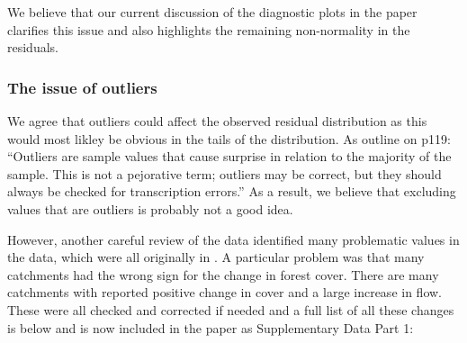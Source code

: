\documentclass[]{elsarticle} %
\begin{document}
We believe that our current discussion of the diagnostic plots in the paper clarifies this issue and also highlights the remaining non-normality in the residuals.

\hypertarget{the-issue-of-outliers}{%
\subsubsection{The issue of outliers}\label{the-issue-of-outliers}}

We agree that outliers could affect the observed residual distribution as this would most likley be obvious in the tails of the distribution. As \citet{venables2013modern} outline on p119:
``Outliers are sample values that cause surprise in relation to the majority of the sample. This is not a pejorative term; outliers may be correct, but they should always be checked for transcription errors.'' As a result, we believe that excluding values that are outliers is probably not a good idea.

However, another careful review of the data identified many problematic values in the data, which were all originally in \citet{zhang2017}. A particular problem was that many catchments had the wrong sign for the change in forest cover. There are many catchments with reported positive change in cover and a large increase in flow. These were all checked and corrected if needed and a full list of all these changes is below and is now included in the paper as Supplementary Data Part 1:
\end{document}
